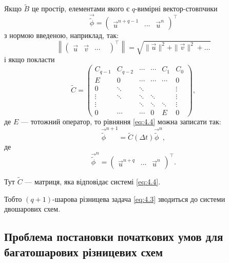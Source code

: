 Якщо $\tilde B$ це простір, елементами якого є $q$-вимірні вектор-стовпчики
\begin{equation*}
    \vec{\tilde{\phi}} = \begin{pmatrix} \vec u^{n + q - 1} & \cdots & \vec u^n \end{pmatrix}^\intercal
\end{equation*}
з нормою введеною, наприклад, так:
\begin{equation*}
    \left\| \begin{pmatrix} \vec u & \vec v & \cdots & \end{pmatrix}^\intercal \right\| = \sqrt{\|\vec u\|^2 + \|\vec v\|^2 + \ldots}
\end{equation*}
і якщо покласти
\begin{equation*}
    \tilde C = \begin{pmatrix}
        C_{q - 1} & C_{q - 2} & \cdots & \cdots & C_1 & C_0 \\
        E & 0 & \cdots & \cdots & \cdots & 0 \\
        0 & \ddots & \ddots & & & \vdots \\
        \vdots & \ddots & \ddots & \ddots & & \vdots \\
        \vdots & & \ddots & \ddots & \ddots & \vdots \\
        0 & \cdots & \cdots & 0 & E & 0
    \end{pmatrix},
\end{equation*}
де $E$ --- тотожний оператор, то рівняння \eqref{eq:4.4} можна записати так:
\begin{equation}
    \label{eq:4.5}
    \vec{\tilde{\phi}}^{n + 1} = \tilde C(\Delta t) \vec{\tilde{\phi}}^n,
\end{equation}
де 
\begin{equation}
    \vec{\tilde{\phi}}^n = \begin{pmatrix} \vec u^{n + q} & \cdots & \vec u^n \end{pmatrix}^\intercal.
\end{equation}

Тут $\tilde C$ --- матриця, яка відповідає системі \eqref{eq:4.4}. \medskip

Тобто $(q + 1)$-шарова різницева задача \eqref{eq:4.3} зводиться до системи двошарових схем.

\subsection{Проблема постановки початкових умов для багатошарових різницевих схем}

